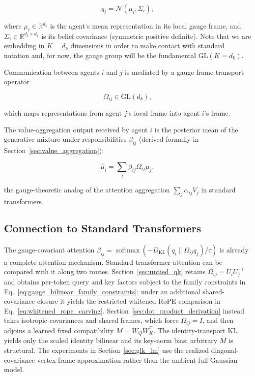 \documentclass[twoside,11pt]{article}
\begin{document}
\begin{equation}
q_i = \mathcal{N}(\mu_i, \Sigma_i),
\end{equation}

where $\mu_i \in \mathbb{R}^{d_k}$ is the agent's mean representation in its local gauge frame, and $\Sigma_i \in \mathbb{R}^{d_k\times d_k}$ is its belief covariance (symmetric positive definite). Note that we are embedding in $K=d_k$ dimensions in order to make contact with standard notation and, for now, the gauge group will be the fundamental $\mathrm{GL}(K=d_k)$.

Communication between agents $i$ and $j$ is mediated by a gauge frame transport operator

\begin{equation}
\Omega_{ij} \in \mathrm{GL}(d_k),
\end{equation}

which maps representations from agent $j$'s local frame into agent $i$'s frame. 

The value-aggregation output received by agent $i$ is the posterior mean of the generative mixture under responsibilities $\beta_{ij}$ (derived formally in Section~\ref{sec:value_aggregation}):

\begin{equation}
\hat\mu_i = \sum_j \beta_{ij} \Omega_{ij}\mu_j,
\end{equation}

the gauge-theoretic analog of the attention aggregation $\sum_j \alpha_{ij} V_j$ in standard transformers.

\subsection{Connection to Standard Transformers}\label{sec:transformer_limit}

The gauge-covariant attention $\beta_{ij}=\operatorname{softmax}(-D_{\mathrm{KL}}(q_i\|\Omega_{ij}q_j)/\tau)$ is already a complete attention mechanism. Standard transformer attention can be compared with it along two routes. Section~\ref{sec:untied_qk} retains $\Omega_{ij}=U_iU_j^{-1}$ and obtains per-token query and key factors subject to the family constraints in Eq.~\eqref{eq:gauge_bilinear_family_constraints}; under an additional shared-covariance closure it yields the restricted whitened RoPE comparison in Eq.~\eqref{eq:whitened_rope_carving}. Section~\ref{sec:dot_product_derivation} instead takes isotropic covariances and shared frames, which force $\Omega_{ij}=I$, and then adjoins a learned fixed compatibility $M=W_QW_K^\top$. The identity-transport KL yields only the scaled identity bilinear and its key-norm bias; arbitrary $M$ is structural. The experiments in Section~\ref{sec:glk_lm} use the realized diagonal-covariance vertex-frame approximation rather than the ambient full-Gaussian model.
\end{document}
